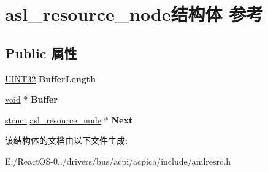 \hypertarget{structasl__resource__node}{}\section{asl\+\_\+resource\+\_\+node结构体 参考}
\label{structasl__resource__node}
\subsection*{Public 属性}
\begin{DoxyCompactItemize}
\item 
\mbox{\label{structasl__resource__node_a005f82bfb4bfac6c2ad54d77bf05a592}} 
\hyperlink{_processor_bind_8h_ae1e6edbbc26d6fbc71a90190d0266018}{U\+I\+N\+T32} {\bfseries Buffer\+Length}
\item 
\mbox{\label{structasl__resource__node_aee023ca48172df9797e9e533da71d8fe}} 
\hyperlink{interfacevoid}{void} $\ast$ {\bfseries Buffer}
\item 
\mbox{\label{structasl__resource__node_a260b626e0cdf5b9bebe0c89f13c3ba18}} 
\hyperlink{interfacestruct}{struct} \hyperlink{structasl__resource__node}{asl\+\_\+resource\+\_\+node} $\ast$ {\bfseries Next}
\end{DoxyCompactItemize}


该结构体的文档由以下文件生成\+:\begin{DoxyCompactItemize}
\item 
E\+:/\+React\+O\+S-\/0../drivers/bus/acpi/acpica/include/amlresrc.\+h\end{DoxyCompactItemize}
